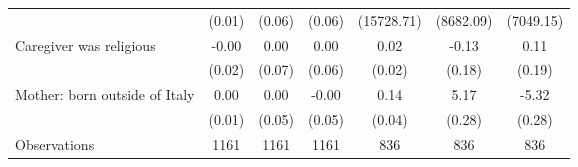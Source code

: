 {\begin{tabular}{l*{6}{c}}
                    &      (0.01)         &      (0.06)         &      (0.06)         &  (15728.71)         &   (8682.09)         &   (7049.15)         \\
\addlinespace
Caregiver was religious&       -0.00         &        0.00         &        0.00         &        0.02         &       -0.13         &        0.11         \\
                    &      (0.02)         &      (0.07)         &      (0.06)         &      (0.02)         &      (0.18)         &      (0.19)         \\
\addlinespace
Mother: born outside of Italy&        0.00         &        0.00         &       -0.00         &        0.14\sym{***}&        5.17\sym{***}&       -5.32\sym{***}\\
                    &      (0.01)         &      (0.05)         &      (0.05)         &      (0.04)         &      (0.28)         &      (0.28)         \\
\midrule
Observations        &        1161         &        1161         &        1161         &         836         &         836         &         836         \\
\bottomrule
\end{tabular}
}
